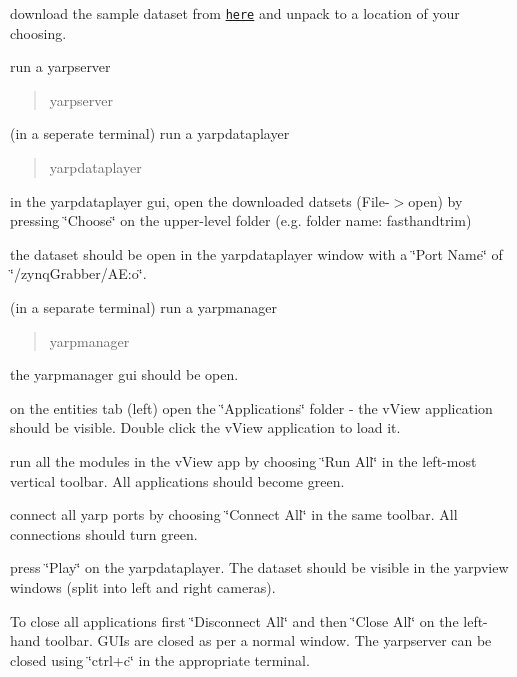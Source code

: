 \begin{DoxyItemize}
\item download the sample dataset from \href{https://doi.org/10.5281/zenodo.2556755}{\tt here} and unpack to a location of your choosing.
\item run a yarpserver
\end{DoxyItemize}

\begin{quote}
yarpserver \end{quote}



\begin{DoxyItemize}
\item (in a seperate terminal) run a yarpdataplayer
\end{DoxyItemize}

\begin{quote}
yarpdataplayer \end{quote}



\begin{DoxyItemize}
\item in the yarpdataplayer gui, open the downloaded datsets (File-\/$>$open) by pressing \char`\"{}\+Choose\char`\"{} on the upper-\/level folder (e.\+g. folder name\+: fasthandtrim)
\item the dataset should be open in the yarpdataplayer window with a \char`\"{}\+Port Name\char`\"{} of \char`\"{}/zynq\+Grabber/\+A\+E\+:o\char`\"{}.
\item (in a separate terminal) run a yarpmanager
\end{DoxyItemize}

\begin{quote}
yarpmanager \end{quote}



\begin{DoxyItemize}
\item the yarpmanager gui should be open.
\item on the entities tab (left) open the \char`\"{}\+Applications\char`\"{} folder -\/ the v\+View application should be visible. Double click the v\+View application to load it.
\item run all the modules in the v\+View app by choosing \char`\"{}\+Run All\char`\"{} in the left-\/most vertical toolbar. All applications should become green.
\item connect all yarp ports by choosing \char`\"{}\+Connect All\char`\"{} in the same toolbar. All connections should turn green.
\item press \char`\"{}\+Play\char`\"{} on the yarpdataplayer. The dataset should be visible in the yarpview windows (split into left and right cameras).
\item To close all applications first \char`\"{}\+Disconnect All\char`\"{} and then \char`\"{}\+Close All\char`\"{} on the left-\/hand toolbar. G\+UI\textquotesingle{}s are closed as per a normal window. The yarpserver can be closed using \char`\"{}ctrl+c\char`\"{} in the appropriate terminal. 
\end{DoxyItemize}